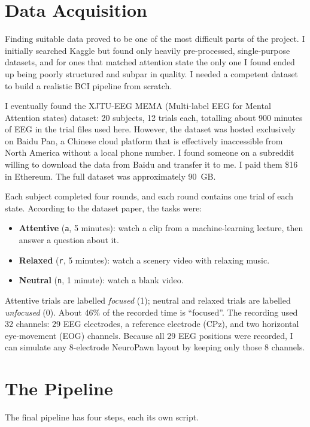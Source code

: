 \documentclass[12pt]{article}
\begin{document}
\section{Data Acquisition}

Finding suitable data proved to be one of the most difficult parts of the project. I initially searched Kaggle but found only heavily pre-processed, single-purpose datasets, and for ones that matched attention state the only one I found ended up being poorly structured and subpar in quality. I needed a competent dataset to build a realistic BCI pipeline from scratch.

I eventually found the XJTU-EEG MEMA (Multi-label EEG for Mental Attention states) dataset: 20 subjects, 12 trials each, totalling about 900 minutes of EEG in the trial files used here. However, the dataset was hosted exclusively on Baidu Pan, a Chinese cloud platform that is effectively inaccessible from North America without a local phone number. I found someone on a subreddit willing to download the data from Baidu and transfer it to me. I paid them \$16 in Ethereum. The full dataset was approximately 90~GB.

Each subject completed four rounds, and each round contains one trial of each state. According to the dataset paper, the tasks were:
\begin{itemize}
    \item \textbf{Attentive} (\texttt{a}, 5 minutes): watch a clip from a machine-learning lecture, then answer a question about it.
    \item \textbf{Relaxed} (\texttt{r}, 5 minutes): watch a scenery video with relaxing music.
    \item \textbf{Neutral} (\texttt{n}, 1 minute): watch a blank video.
\end{itemize}
Attentive trials are labelled \emph{focused} (1); neutral and relaxed trials are labelled \emph{unfocused} (0). About 46\% of the recorded time is ``focused''. The recording used 32 channels: 29 EEG electrodes, a reference electrode (CPz), and two horizontal eye-movement (EOG) channels. Because all 29 EEG positions were recorded, I can simulate any 8-electrode NeuroPawn layout by keeping only those 8 channels.

\section{The Pipeline}

The final pipeline has four steps, each its own script.
\end{document}
